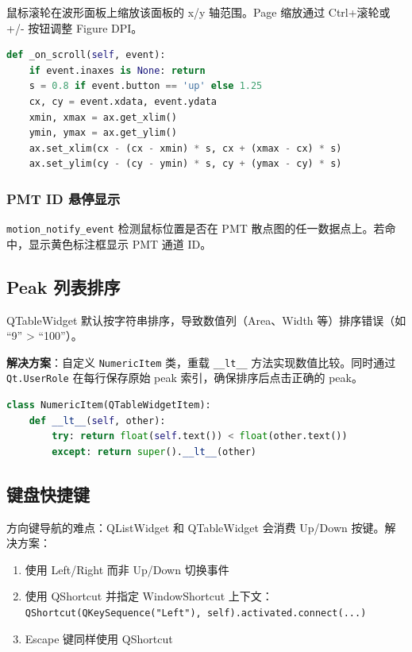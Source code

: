 \documentclass[12pt,a4paper]{article}
\begin{document}
鼠标滚轮在波形面板上缩放该面板的 x/y 轴范围。Page 缩放通过 Ctrl+滚轮或 +/- 按钮调整 Figure DPI。

\begin{lstlisting}[language=Python]
def _on_scroll(self, event):
    if event.inaxes is None: return
    s = 0.8 if event.button == 'up' else 1.25
    cx, cy = event.xdata, event.ydata
    xmin, xmax = ax.get_xlim()
    ymin, ymax = ax.get_ylim()
    ax.set_xlim(cx - (cx - xmin) * s, cx + (xmax - cx) * s)
    ax.set_ylim(cy - (cy - ymin) * s, cy + (ymax - cy) * s)
\end{lstlisting}

\subsubsection{PMT ID 悬停显示}

\texttt{motion\_notify\_event} 检测鼠标位置是否在 PMT 散点图的任一数据点上。若命中，显示黄色标注框显示 PMT 通道 ID。

\subsection{Peak 列表排序}

QTableWidget 默认按字符串排序，导致数值列（Area、Width 等）排序错误（如 ``9'' > ``100''）。

\textbf{解决方案}：自定义 \texttt{NumericItem} 类，重载 \texttt{\_\_lt\_\_} 方法实现数值比较。同时通过 \texttt{Qt.UserRole} 在每行保存原始 peak 索引，确保排序后点击正确的 peak。

\begin{lstlisting}[language=Python]
class NumericItem(QTableWidgetItem):
    def __lt__(self, other):
        try: return float(self.text()) < float(other.text())
        except: return super().__lt__(other)
\end{lstlisting}

\subsection{键盘快捷键}

方向键导航的难点：QListWidget 和 QTableWidget 会消费 Up/Down 按键。解决方案：

\begin{enumerate}[itemsep=2pt]
\item 使用 Left/Right 而非 Up/Down 切换事件
\item 使用 QShortcut 并指定 WindowShortcut 上下文：\\
  \texttt{QShortcut(QKeySequence("Left"), self).activated.connect(...)}
\item Escape 键同样使用 QShortcut
\end{enumerate}
\end{document}
